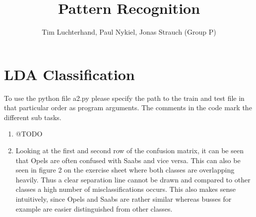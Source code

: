 \documentclass[DIN, pagenumber=false, fontsize=11pt, parskip=half]{scrartcl}
\title{Pattern Recognition}
\author{Tim Luchterhand, Paul Nykiel, Jonas Strauch (Group P)}
\begin{document}
    \maketitle
    \section{LDA Classification}
    To use the python file a2.py please specify the path to the train and test file in that particular order as program arguments.
    The comments in the code mark the different sub tasks.
    \begin{enumerate}
        \item @TODO
        \setcounter{enumi}{4}
        \item Looking at the first and second row of the confusion matrix, it can be seen that Opels are often confused with Saabs
        and vice versa. This can also be seen in figure 2 on the exercise sheet where both classes are overlapping heavily. Thus
        a clear separation line cannot be drawn and compared to other classes a high number of misclassifications occurs. This also
        makes sense intuitively, since Opels and Saabs are rather similar whereas busses for example are easier distinguished from
        other classes.
    \end{enumerate}
\end{document}
